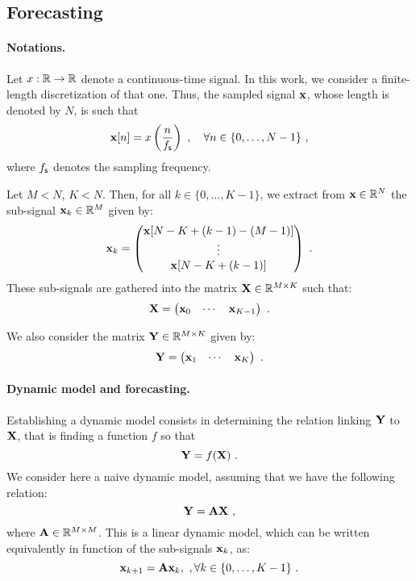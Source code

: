 
\subsection{Forecasting}

\paragraph{Notations.} Let $x:{\mathbb R}\to{\mathbb R}$ denote a continuous-time signal. In this work, we consider a finite-length discretization of that one. Thus, the sampled signal ${\mathbf x}$, whose length is denoted by $N$, is such that
\[
\bx[n] = x\left(\frac{n}{\fs}\right)\ ,\quad \forall n\in\{0,\ldots,N-1\}\ , 
\]
where $f_{\mathsf s}$ denotes the sampling frequency. 

Let $M<N$, $K<N$. Then, for all $k\in\{0,\ldots,K-1\}$, we extract from ${\mathbf x}\in{\mathbb R}^N$ the sub-signal ${\mathbf x}_k\in{\mathbb R}^M$ given by:
\[
{\mathbf x}_k = 
\begin{pmatrix}
{\mathbf x}[N-K+(k-1)-(M-1)] \\
\vdots \\
{\mathbf x}[N-K+(k-1)]
\end{pmatrix}\ .
\]  
These sub-signals are gathered into the matrix ${\mathbf X}\in{\mathbb R}^{M\times K}$ such that:
\[
{\mathbf X} = 
\begin{pmatrix}
{\mathbf x}_0 & \cdots & {\mathbf x}_{K-1}
\end{pmatrix}\ .
\]

We also consider the matrix ${\mathbf Y}\in{\mathbb R}^{M\times K}$ given by:
\[
{\mathbf Y} = 
\begin{pmatrix}
{\mathbf x}_1 & \cdots & {\mathbf x}_{K}
\end{pmatrix}\ .
\]

\paragraph{Dynamic model and forecasting.} Establishing a dynamic model consists in determining the relation linking ${\mathbf Y}$ to ${\mathbf X}$, that is finding a function $f$ so that
\[
{\mathbf Y} = f({\mathbf X})\ .
\] 
We consider here a naive dynamic model, assuming that we have the following relation:
\begin{equation}
{\mathbf Y} = {\mathbf A}{\mathbf X}\ ,
\end{equation}
where ${\mathbf A}\in{\mathbb R}^{M\times M}$. This is a linear dynamic model, which can be written equivalently in function of the sub-signals ${\mathbf x}_k$, as:
\begin{equation}
{\mathbf x}_{k+1} = {\mathbf A}{\mathbf x}_{k},\ ,\forall k\in\{0,\dots,K-1\}\ .
\end{equation}


